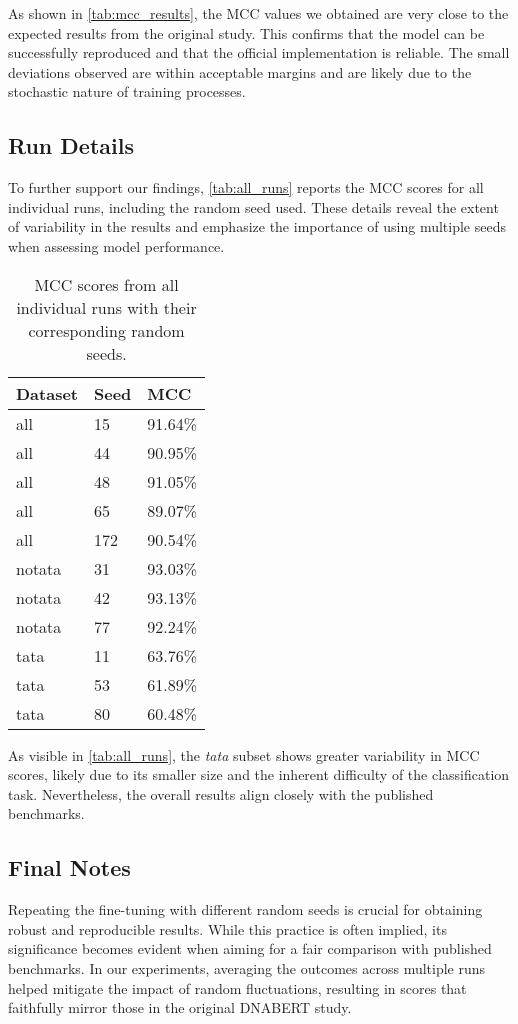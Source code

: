 As shown in \autoref{tab:mcc_results}, the MCC values we obtained are very close to the expected results from the original study. This confirms that the model can be successfully reproduced and that the official implementation is reliable. The small deviations observed are within acceptable margins and are likely due to the stochastic nature of training processes.

\subsection{Run Details}

To further support our findings, \autoref{tab:all_runs} reports the MCC scores for all individual runs, including the random seed used. These details reveal the extent of variability in the results and emphasize the importance of using multiple seeds when assessing model performance.

\begin{table}[h!]
\centering
\begin{tabular}{|l|l|l|}
\hline
Dataset & Seed & MCC \\
\hline
all & 15 & 91.64\% \\
all & 44 & 90.95\% \\
all & 48 & 91.05\% \\
all & 65 & 89.07\% \\
all & 172 & 90.54\% \\
notata & 31 & 93.03\% \\
notata & 42 & 93.13\% \\
notata & 77 & 92.24\% \\
tata & 11 & 63.76\% \\
tata & 53 & 61.89\% \\
tata & 80 & 60.48\% \\
\hline
\end{tabular}
\caption{MCC scores from all individual runs with their corresponding random seeds.}
\label{tab:all_runs}
\end{table}

As visible in \autoref{tab:all_runs}, the \textit{tata} subset shows greater variability in MCC scores, likely due to its smaller size and the inherent difficulty of the classification task. Nevertheless, the overall results align closely with the published benchmarks.

\subsection{Final Notes}

Repeating the fine-tuning with different random seeds is crucial for obtaining robust and reproducible results. While this practice is often implied, its significance becomes evident when aiming for a fair comparison with published benchmarks. In our experiments, averaging the outcomes across multiple runs helped mitigate the impact of random fluctuations, resulting in scores that faithfully mirror those in the original DNABERT study.